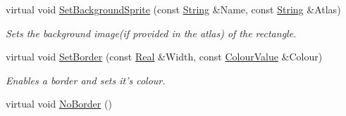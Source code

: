 \begin{DoxyCompactItemize}
virtual void \hyperlink{classphys_1_1UI_1_1Rectangle_aa20172e511e24ed24e21e0bdac0e00c4}{SetBackgroundSprite} (const \hyperlink{namespacephys_aa03900411993de7fbfec4789bc1d392e}{String} \&Name, const \hyperlink{namespacephys_aa03900411993de7fbfec4789bc1d392e}{String} \&Atlas)
\begin{DoxyCompactList}\small\item\em Sets the background image(if provided in the atlas) of the rectangle. \item\end{DoxyCompactList}\item 
virtual void \hyperlink{classphys_1_1UI_1_1Rectangle_aaea6f9d5cd62b63a132c03c894a6d8de}{SetBorder} (const \hyperlink{namespacephys_af7eb897198d265b8e868f45240230d5f}{Real} \&Width, const \hyperlink{classphys_1_1ColourValue}{ColourValue} \&Colour)
\begin{DoxyCompactList}\small\item\em Enables a border and sets it's colour. \item\end{DoxyCompactList}\item 
\hypertarget{classphys_1_1UI_1_1Rectangle_aebeea2052a72be49eb9dece731022c78}{
virtual void \hyperlink{classphys_1_1UI_1_1Rectangle_aebeea2052a72be49eb9dece731022c78}{NoBorder} ()}
\label{d1/d5d/classphys_1_1UI_1_1Rectangle_aebeea2052a72be49eb9dece731022c78}


\end{DoxyCompactItemize}
